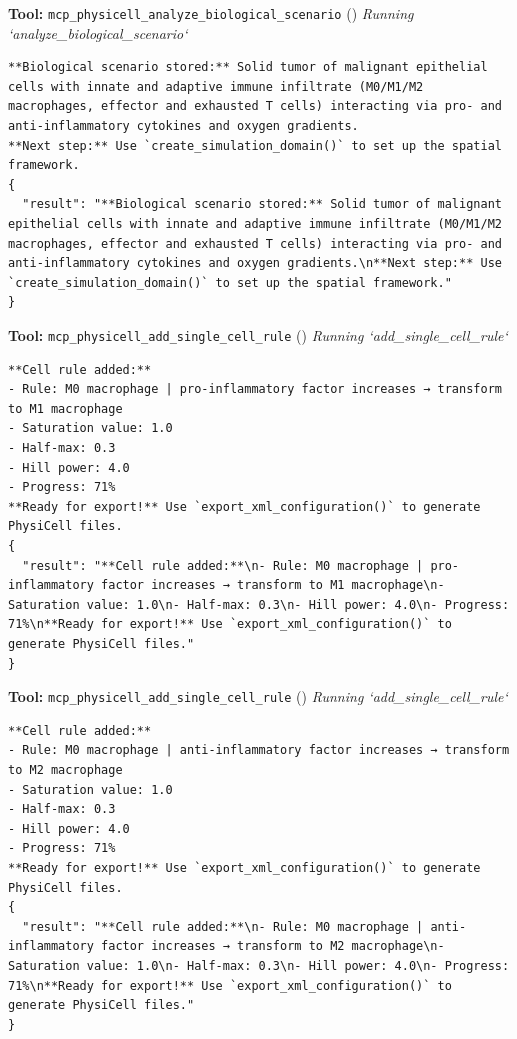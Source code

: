 \documentclass[11pt,a4paper]{article}
\begin{document}
\begin{toolokbox}
\textbf{Tool:} \texttt{mcp\_physicell\_analyze\_biological\_scenario} (\checkmark)
\textit{Running `analyze\_biological\_scenario`}
\begin{lstlisting}
**Biological scenario stored:** Solid tumor of malignant epithelial cells with innate and adaptive immune infiltrate (M0/M1/M2 macrophages, effector and exhausted T cells) interacting via pro- and anti-inflammatory cytokines and oxygen gradients.
**Next step:** Use `create_simulation_domain()` to set up the spatial framework.
{
  "result": "**Biological scenario stored:** Solid tumor of malignant epithelial cells with innate and adaptive immune infiltrate (M0/M1/M2 macrophages, effector and exhausted T cells) interacting via pro- and anti-inflammatory cytokines and oxygen gradients.\n**Next step:** Use `create_simulation_domain()` to set up the spatial framework."
}
\end{lstlisting}
\end{toolokbox}
\begin{toolokbox}
\textbf{Tool:} \texttt{mcp\_physicell\_add\_single\_cell\_rule} (\checkmark)
\textit{Running `add\_single\_cell\_rule`}
\begin{lstlisting}
**Cell rule added:**
- Rule: M0 macrophage | pro-inflammatory factor increases → transform to M1 macrophage
- Saturation value: 1.0
- Half-max: 0.3
- Hill power: 4.0
- Progress: 71%
**Ready for export!** Use `export_xml_configuration()` to generate PhysiCell files.
{
  "result": "**Cell rule added:**\n- Rule: M0 macrophage | pro-inflammatory factor increases → transform to M1 macrophage\n- Saturation value: 1.0\n- Half-max: 0.3\n- Hill power: 4.0\n- Progress: 71%\n**Ready for export!** Use `export_xml_configuration()` to generate PhysiCell files."
}
\end{lstlisting}
\end{toolokbox}
\begin{toolokbox}
\textbf{Tool:} \texttt{mcp\_physicell\_add\_single\_cell\_rule} (\checkmark)
\textit{Running `add\_single\_cell\_rule`}
\begin{lstlisting}
**Cell rule added:**
- Rule: M0 macrophage | anti-inflammatory factor increases → transform to M2 macrophage
- Saturation value: 1.0
- Half-max: 0.3
- Hill power: 4.0
- Progress: 71%
**Ready for export!** Use `export_xml_configuration()` to generate PhysiCell files.
{
  "result": "**Cell rule added:**\n- Rule: M0 macrophage | anti-inflammatory factor increases → transform to M2 macrophage\n- Saturation value: 1.0\n- Half-max: 0.3\n- Hill power: 4.0\n- Progress: 71%\n**Ready for export!** Use `export_xml_configuration()` to generate PhysiCell files."
}
\end{lstlisting}
\end{toolokbox}
\end{document}
